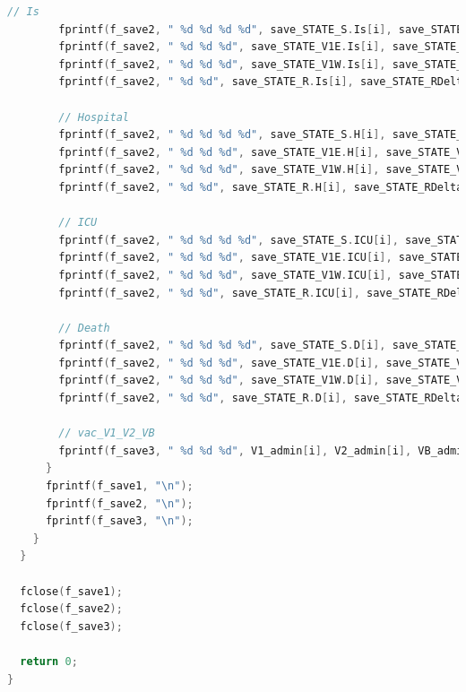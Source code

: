 \documentclass[bwprint]{gmcmthesis}
\numberwithin{figure}{section}
\begin{document}
\begin{lstlisting}[language=C]
        // Is
        fprintf(f_save2, " %d %d %d %d", save_STATE_S.Is[i], save_STATE_V1.Is[i], save_STATE_V2.Is[i], save_STATE_V3.Is[i]);
        fprintf(f_save2, " %d %d %d", save_STATE_V1E.Is[i], save_STATE_V2E.Is[i], save_STATE_V3E.Is[i]);
        fprintf(f_save2, " %d %d %d", save_STATE_V1W.Is[i], save_STATE_V2W.Is[i], save_STATE_V3W.Is[i]);
        fprintf(f_save2, " %d %d", save_STATE_R.Is[i], save_STATE_RDelta.Is[i]);

        // Hospital
        fprintf(f_save2, " %d %d %d %d", save_STATE_S.H[i], save_STATE_V1.H[i], save_STATE_V2.H[i], save_STATE_V3.H[i]);
        fprintf(f_save2, " %d %d %d", save_STATE_V1E.H[i], save_STATE_V2E.H[i], save_STATE_V3E.H[i]);
        fprintf(f_save2, " %d %d %d", save_STATE_V1W.H[i], save_STATE_V2W.H[i], save_STATE_V3W.H[i]);
        fprintf(f_save2, " %d %d", save_STATE_R.H[i], save_STATE_RDelta.H[i]);

        // ICU
        fprintf(f_save2, " %d %d %d %d", save_STATE_S.ICU[i], save_STATE_V1.ICU[i], save_STATE_V2.ICU[i], save_STATE_V3.ICU[i]);
        fprintf(f_save2, " %d %d %d", save_STATE_V1E.ICU[i], save_STATE_V2E.ICU[i], save_STATE_V3E.ICU[i]);
        fprintf(f_save2, " %d %d %d", save_STATE_V1W.ICU[i], save_STATE_V2W.ICU[i], save_STATE_V3W.ICU[i]);
        fprintf(f_save2, " %d %d", save_STATE_R.ICU[i], save_STATE_RDelta.ICU[i]);

        // Death
        fprintf(f_save2, " %d %d %d %d", save_STATE_S.D[i], save_STATE_V1.D[i], save_STATE_V2.D[i], save_STATE_V3.D[i]);
        fprintf(f_save2, " %d %d %d", save_STATE_V1E.D[i], save_STATE_V2E.D[i], save_STATE_V3E.D[i]);
        fprintf(f_save2, " %d %d %d", save_STATE_V1W.D[i], save_STATE_V2W.D[i], save_STATE_V3W.D[i]);
        fprintf(f_save2, " %d %d", save_STATE_R.D[i], save_STATE_RDelta.D[i]);

        // vac_V1_V2_VB
        fprintf(f_save3, " %d %d %d", V1_admin[i], V2_admin[i], VB_admin[i]);
      }
      fprintf(f_save1, "\n");
      fprintf(f_save2, "\n");
      fprintf(f_save3, "\n");
    }
  }

  fclose(f_save1);
  fclose(f_save2);
  fclose(f_save3);

  return 0;
}
 \end{lstlisting}
\end{document}
